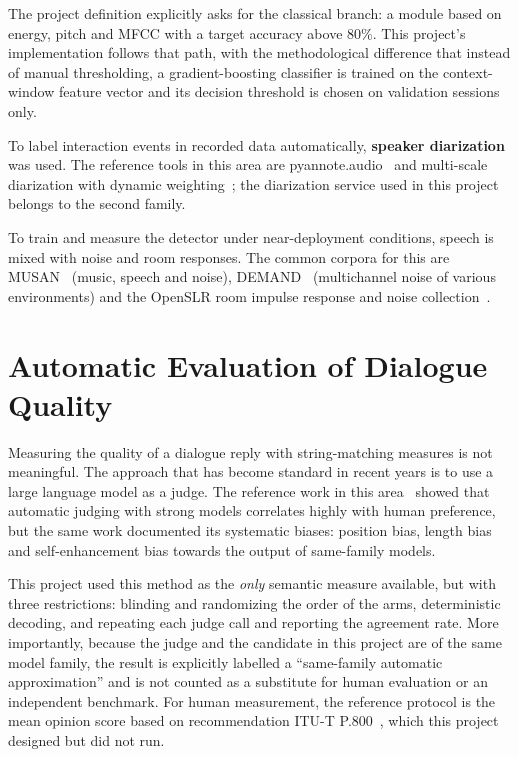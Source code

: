 The project definition explicitly asks for the classical branch: a module based on
energy, pitch and MFCC with a target accuracy above 80\%. This project's
implementation follows that path, with the methodological difference that instead of
manual thresholding, a gradient-boosting classifier is trained on the context-window
feature vector and its decision threshold is chosen on validation sessions only.

To label interaction events in recorded data automatically, \textbf{speaker
diarization} was used. The reference tools in this area are
pyannote.audio~\cite{bredin2020pyannote} and multi-scale diarization with dynamic
weighting~\cite{park2022msdd}; the diarization service used in this project belongs to
the second family.

To train and measure the detector under near-deployment conditions, speech is mixed
with noise and room responses. The common corpora for this are
MUSAN~\cite{snyder2015musan} (music, speech and noise),
DEMAND~\cite{thiemann2013demand} (multichannel noise of various environments) and the
OpenSLR room impulse response and noise collection~\cite{ko2017rir}.

\section{Automatic Evaluation of Dialogue Quality}
\label{sec:eval-lit}

Measuring the quality of a dialogue reply with string-matching measures is not
meaningful. The approach that has become standard in recent years is to use a large
language model as a judge. The reference work in this area~\cite{zheng2023mtbench}
showed that automatic judging with strong models correlates highly with human
preference, but the same work documented its systematic biases: position bias, length
bias and self-enhancement bias towards the output of same-family models.

This project used this method as the \emph{only} semantic measure available, but with
three restrictions: blinding and randomizing the order of the arms, deterministic
decoding, and repeating each judge call and reporting the agreement rate. More
importantly, because the judge and the candidate in this project are of the same model
family, the result is explicitly labelled a ``same-family automatic approximation''
and is not counted as a substitute for human evaluation or an independent benchmark.
For human measurement, the reference protocol is the mean opinion score based on
recommendation ITU-T P.800~\cite{itu1996p800}, which this project designed but did not
run.

